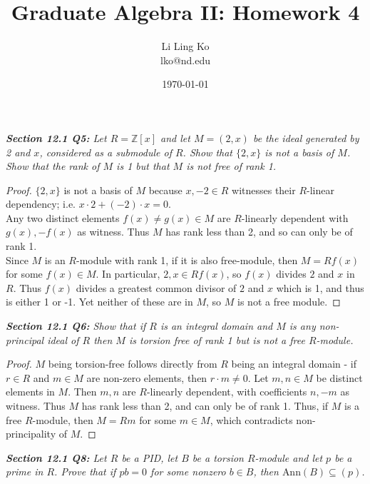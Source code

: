 \documentclass{article}
\begin{document}
\title{Graduate Algebra II: Homework 4}
\author{Li Ling Ko\\ lko@nd.edu}
\date{\today}
\maketitle

\it \textbf{Section 12.1 Q5:} Let $R=\mathbb{Z}[x]$ and let $M=(2,x)$ be
  the ideal generated by 2 and $x$, considered as a submodule of $R$. Show
  that $\{2,x\}$ is not a basis of $M$. Show that the rank of $M$ is 1 but
  that $M$ is not free of rank 1.

  \begin{proof}
    $\{2,x\}$ is not a basis of $M$ because $x,-2\in R$ witnesses their
    $R$-linear dependency; i.e. $x\cdot2+(-2)\cdot x=0$. \\

    Any two distinct elements $f(x)\neq g(x)\in M$ are $R$-linearly
    dependent with $g(x),-f(x)$ as witness. Thus $M$ has rank less than 2,
    and so can only be of rank 1. \\

    Since $M$ is an $R$-module with rank 1, if it is also free-module, then
    $M=Rf(x)$ for some $f(x)\in M$. In particular, $2,x\in Rf(x)$, so
    $f(x)$ divides $2$ and $x$ in $R$. Thus $f(x)$ divides a greatest
    common divisor of $2$ and $x$ which is 1, and thus is either 1 or -1.
    Yet neither of these are in $M$, so $M$ is not a free module.
  \end{proof}

\it \textbf{Section 12.1 Q6:} Show that if $R$ is an integral domain and
  $M$ is any non-principal ideal of $R$ then $M$ is torsion free of rank 1
  but is not a free $R$-module.

  \begin{proof}
    $M$ being torsion-free follows directly from $R$ being an integral
    domain - if $r\in R$ and $m\in M$ are non-zero elements, then $r\cdot
    m\neq 0$. Let $m,n\in M$ be distinct elements in $M$. Then $m,n$ are
    $R$-linearly dependent, with coefficients $n,-m$ as witness. Thus $M$
    has rank less than 2, and can only be of rank 1. Thus, if $M$ is a free
    $R$-module, then $M=Rm$ for some $m\in M$, which contradicts
    non-principality of $M$.
  \end{proof}

\it \textbf{Section 12.1 Q8:} Let $R$ be a PID, let $B$ be a torsion
  $R$-module and let $p$ be a prime in $R$. Prove that if $pb=0$ for some
  nonzero $b\in B$, then $\text{Ann}(B)\subseteq(p)$.
\end{document}
